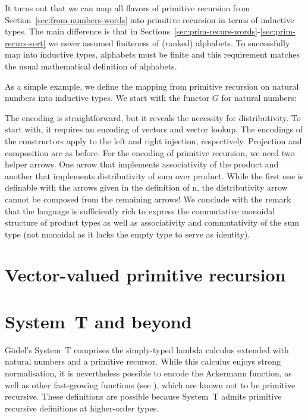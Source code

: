\documentclass{jfp}
\begin{document}
It turns out that we can map all flavors of primitive recursion from
Section~\ref{sec:from-numbers-words} into primitive recursion in terms
of inductive types. The main difference is that in
Sections~\ref{sec:prim-recurs-words}-\ref{sec:prim-recurs-sort} we
never assumed finiteness of (ranked) alphabets. To successfully map into
inductive types, alphabets must be finite and this requirement
matches the usual mathematical definition of alphabets.

As a simple example, we define the mapping from primitive recursion on
natural numbers into inductive types. We start with the functor $G$
for natural numbers:
\ccDefGNat

The encoding is straightforward, but it reveals the necessity for
distributivity. To start with, it requires an 
encoding of vectors and vector lookup.
\ccFunMkvec
\ccDefNatToInd
The encodings of the constructors apply {\Acon} to the left and right
injection, respectively. Projection and composition are as before. For
the encoding of primitive recursion, we need two helper arrows. One
arrow that implements associativity of the product and another that
implements distributivity of sum over product. While the first one is
definable with the arrows given in the definition of {\APR n}, the
distributivity arrow cannot be composed from the remaining arrows!
\ccFunAssocDist
We conclude with the remark that the language is sufficiently rich to
express the commutative monoidal structure of product types as well as
associativity and commutativity of the sum type (not monoidal as it
lacks the empty type to serve as identity).

\section{Vector-valued primitive recursion}
\label{sec:vect-valu-prim}

\section{System~T and beyond}
\label{sec:system-t-beyond}

Gödel's System~T comprises the simply-typed lambda calculus extended
with natural numbers and a primitive recursor. While this calculus
enjoys strong normalisation, it is nevertheless possible to encode the
Ackermann function, as well as other fast-growing functions (see
\cite{DBLP:books/cu/Ha2016,DBLP:journals/corr/Widemann16}), which are known not 
to be primitive recursive. These definitions are possible because
System~T admits primitive recursive definitions at higher-order types.
\end{document}
